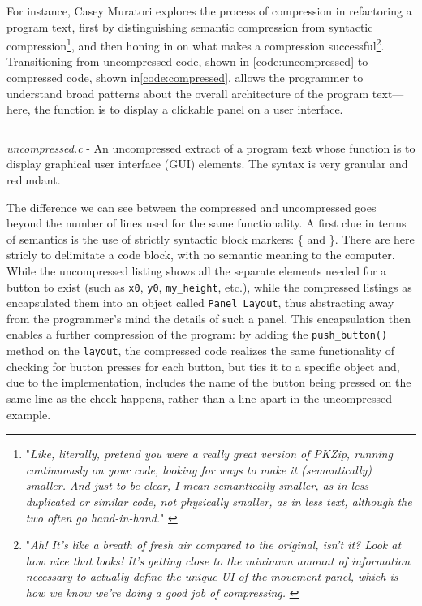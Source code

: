 For instance, Casey Muratori explores the process of compression in refactoring a program text, first by distinguishing semantic compression from syntactic compression\footnote{"\emph{Like, literally, pretend you were a really great version of PKZip, running continuously on your code, looking for ways to make it (semantically) smaller. And just to be clear, I mean semantically smaller, as in less duplicated or similar code, not physically smaller, as in less text, although the two often go hand-in-hand.}" \citep{muratori_semantic_2014}}, and then honing in on what makes a compression successful\footnote{"\emph{Ah! It's like a breath of fresh air compared to the original, isn't it? Look at how nice that looks! It's getting close to the minimum amount of information necessary to actually define the unique UI of the movement panel, which is how we know we're doing a good job of compressing.} \citep{muratori_semantic_2014}}. Transitioning from uncompressed code, shown in \autoref{code:uncompressed} to compressed code, shown in\autoref{code:compressed}, allows the programmer to understand broad patterns about the overall architecture of the program text—here, the function is to display a clickable panel on a user interface.

\begin{listing}
    \inputminted[]{c}{./corpus/uncompressed.c}
    \caption{\emph{uncompressed.c} - An uncompressed extract of a program text whose function is to display graphical user interface (GUI) elements. The syntax is very granular and redundant. \citep{muratori_semantic_2014}}
    \label{code:uncompressed}
\end{listing}

The difference we can see between the compressed and uncompressed goes beyond the number of lines used for the same functionality. A first clue in terms of semantics is the use of strictly syntactic block markers: \{ and \}. There are here stricly to delimitate a code block, with no semantic meaning to the computer. While the uncompressed listing shows all the separate elements needed for a button to exist (such as \lstinline{x0}, \lstinline{y0}, \lstinline{my_height}, etc.), while the compressed listings as encapsulated them into an object called \lstinline{Panel_Layout}, thus abstracting away from the programmer's mind the details of such a panel. This encapsulation then enables a further compression of the program: by adding the \lstinline{push_button()} method on the \lstinline{layout}, the compressed code realizes the same functionality of checking for button presses for each button, but ties it to a specific object and, due to the implementation, includes the name of the button being pressed on the same line as the check happens, rather than a line apart in the uncompressed example.

